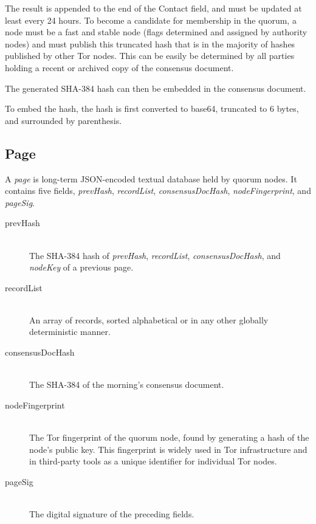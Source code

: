 The result is appended to the end of the Contact field, and must be updated at least every 24 hours. To become a candidate for membership in the quorum, a node must be a fast and stable node (flags determined and assigned by authority nodes) and must publish this truncated hash that is in the majority of hashes published by other Tor nodes. This can be easily be determined by all parties holding a recent or archived copy of the consensus document.




The generated SHA-384 hash can then be embedded in the consensus document. 

 To embed the hash, the hash is first converted to base64, truncated to 6 bytes, and surrounded by parenthesis. 

\subsection{Page}

A \textit{page} is long-term JSON-encoded textual database held by quorum nodes. It contains five fields, \textit{prevHash}, \textit{recordList}, \textit{consensusDocHash}, \textit{nodeFingerprint}, and \textit{pageSig}. 

\begin{description}
	\item[prevHash] \hfill \\
		The SHA-384 hash of \textit{prevHash}, \textit{recordList}, \textit{consensusDocHash}, and \textit{nodeKey} of a previous page.
	\item[recordList] \hfill \\
		An array of records, sorted alphabetical or in any other globally deterministic manner.
	\item[consensusDocHash] \hfill \\
		The SHA-384 of the morning's consensus document.
	\item[nodeFingerprint] \hfill \\
		The Tor fingerprint of the quorum node, found by generating a hash of the node's public key. This fingerprint is widely used in Tor infrastructure and in third-party tools as a unique identifier for individual Tor nodes.
	\item[pageSig] \hfill \\
		The digital signature of the preceding fields.
\end{description}

